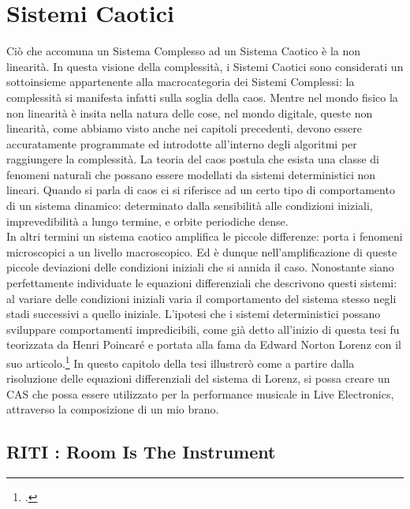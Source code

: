 \section{Sistemi Caotici}
\label{sec:Sistemi Caotici}

Ciò che accomuna un Sistema Complesso ad un Sistema Caotico è la non linearità.
In questa visione della complessità, i Sistemi Caotici sono considerati un sottoinsieme 
appartenente alla macrocategoria dei Sistemi Complessi: la complessità 
si manifesta infatti sulla soglia della caos. 
Mentre nel mondo fisico la non linearità è insita nella natura
delle cose, nel mondo digitale, queste non linearità, come abbiamo visto
anche nei capitoli precedenti, devono essere accuratamente
programmate ed introdotte all’interno degli algoritmi per raggiungere la complessità. 
La teoria del caos postula che esista una classe di fenomeni naturali che
possano essere modellati da sistemi deterministici non lineari.
Quando si parla di caos ci si riferisce ad un certo tipo di comportamento di
un sistema dinamico: determinato dalla sensibilità alle condizioni iniziali,
imprevedibilità a lungo termine, e orbite periodiche dense. \\ 
In altri termini un sistema caotico amplifica le piccole differenze: porta i fenomeni microscopici
a un livello macroscopico. Ed è dunque nell’amplificazione di queste piccole
deviazioni delle condizioni iniziali che si annida il caso.
Nonostante siano perfettamente individuate le equazioni differenziali che
descrivono questi sistemi: al variare delle condizioni iniziali 
varia il comportamento del sistema stesso negli stadi successivi a quello iniziale.
L’ipotesi che i sistemi deterministici possano sviluppare comportamenti impredicibili, 
come già detto all'inizio di questa tesi fu teorizzata da Henri Poincaré e portata alla
fama da Edward Norton Lorenz con il suo articolo.\footcite{Lorenzdnf}
In questo capitolo della tesi illustrerò come a partire dalla
risoluzione delle equazioni differenziali del sistema di Lorenz, si possa
creare un CAS che possa essere utilizzato per la
performance musicale in Live Electronics, attraverso
la composizione di un mio brano.

\subsection{RITI : Room Is The Instrument}
\label{RITI : Room Is The Instrument}

